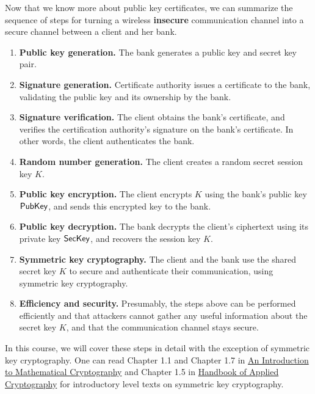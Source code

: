 Now that we know more about public key certificates, we can summarize the sequence of steps for turning a wireless {\bf insecure} communication channel into a secure channel between a client and her bank.
\begin{enumerate}
    \item {\bf Public key generation.} The bank generates a public key and secret key pair.

    \item {\bf Signature generation.} Certificate authority issues a certificate to the bank, validating the public key and its ownership by the bank.

    \item {\bf Signature verification.} The client obtains the bank’s certificate, and verifies the certification authority’s signature on the bank’s certificate. In other words, the client authenticates the bank.

    \item {\bf Random number generation.} The client creates a random secret session key $K$.

    \item {\bf Public key encryption.} The client encrypts $K$ using the bank’s public key ${\sf PubKey}$, and sends this encrypted key to the bank.

    \item {\bf Public key decryption.} The bank decrypts the client’s ciphertext using its private key ${\sf SecKey}$, and recovers the session key $K$.

    \item {\bf Symmetric key cryptography.} The client and the bank use the shared secret key $K$ to secure and authenticate their communication, using symmetric key cryptography.

    \item {\bf Efficiency and security.} Presumably, the steps above can be performed efficiently and that attackers cannot gather any useful information about the secret key $K$, and that the communication channel stays secure.
\end{enumerate}

In this course, we will cover these steps in detail with the exception of symmetric key cryptography. 
One can read Chapter 1.1 and Chapter 1.7 in \href{https://link-springer-com.proxy.lib.uwaterloo.ca/book/10.1007/978-1-4939-1711-2}{An Introduction to Mathematical Cryptography} and Chapter 1.5 in \href{https://www-taylorfrancis-com.proxy.lib.uwaterloo.ca/books/mono/10.1201/9780429466335/handbook-applied-cryptography-alfred-menezes-paul-van-oorschot-scott-vanstone}{Handbook of Applied Cryptography} 
for introductory level texts on symmetric key cryptography.

